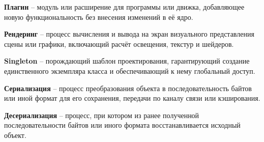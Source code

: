 \textbf{Плагин} -- модуль или расширение для программы или движка, добавляющее новую функциональность без внесения изменений в её ядро.

\textbf{Рендеринг} -- процесс вычисления и вывода на экран визуального представления сцены или графики, включающий расчёт освещения, текстур и шейдеров.

\textbf{Singleton} -- порождающий шаблон проектирования, гарантирующий создание единственного экземпляра класса и обеспечивающий к нему глобальный доступ.

\textbf{Сериализация} -- процесс преобразования объекта в последовательность байтов или иной формат для его сохранения, передачи по каналу связи или кэширования.

\textbf{Десериализация} -- процесс, при котором из ранее полученной последовательности байтов или иного формата восстанавливается исходный объект.